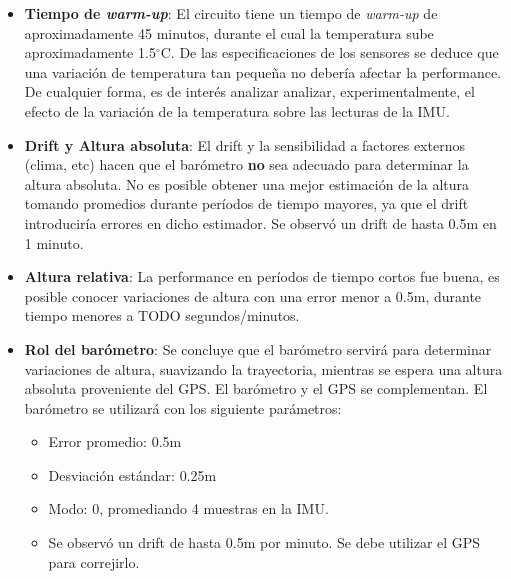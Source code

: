 \documentclass[spanish,12pt,a4paper,titlepage]{report}
\newcommand{\degc}{$^\circ$C}
\begin{document}
\begin{itemize}
\item \textbf{Tiempo de \textit{warm-up}}: El circuito tiene un tiempo de \textit{warm-up} de aproximadamente 45 minutos, durante el cual la temperatura sube aproximadamente 1.5\degc. De las especificaciones de los sensores se deduce que una variación de temperatura tan pequeña no debería afectar la performance. De cualquier forma, es de interés analizar analizar, experimentalmente, el efecto de la variación de la temperatura sobre las lecturas de la IMU.
\item \textbf{Drift y Altura absoluta}: El drift y la sensibilidad a factores externos (clima, etc) hacen que el barómetro \textbf{no} sea adecuado para determinar la altura absoluta. No es posible obtener una mejor estimación de la altura tomando promedios durante períodos de tiempo mayores, ya que el drift introduciría errores en dicho estimador. Se observó un drift de hasta 0.5m en 1 minuto.
\item \textbf{Altura relativa}: La performance en períodos de tiempo cortos fue buena, es posible conocer variaciones de altura con una error menor a 0.5m, durante tiempo menores a TODO segundos/minutos.
\item \textbf{Rol del barómetro}: Se concluye que el barómetro servirá para determinar variaciones de altura, suavizando la trayectoria, mientras se espera una altura absoluta proveniente del GPS. El barómetro y el GPS se complementan. El barómetro se utilizará con los siguiente parámetros:
  \begin{itemize}
  \item Error promedio: 0.5m
  \item Desviación estándar: 0.25m
  \item Modo: 0, promediando 4 muestras en la IMU.
  \item Se observó un drift de hasta 0.5m por minuto. Se debe utilizar el GPS para correjirlo.
  \end{itemize}
\end{itemize}
\end{document}
